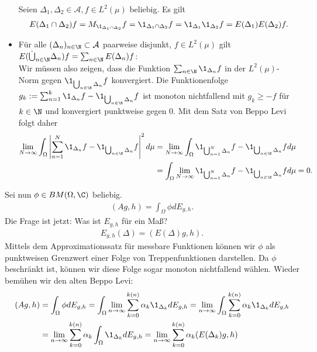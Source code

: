 \begin{solution}
\begin{itemize}
  Seien $\Delta_1,\Delta_2 \in \mathcal{A}, f \in L^2(\mu)$ beliebig. Es gilt
  \begin{align*}
    E(\Delta_1 \cap \Delta_2)f = M_{\1_{\Delta_1 \cap \Delta_2}}f
    = \1_{\Delta_1 \cap \Delta_2}f = \1_{\Delta_1}\1_{\Delta_2}f
    = E(\Delta_1)E(\Delta_2)f.
  \end{align*}
  \item Für alle $(\Delta_n)_{n \in \N} \subset \mathcal{A}$ paarweise disjunkt, $f \in L^2(\mu)$ gilt $E(\dot\bigcup_{n \in \N}\Delta_n)f = \sum_{n \in \N}E(\Delta_n)f$: \\
  Wir müssen also zeigen, dass die Funktion $\sum_{n \in \N}\1_{\Delta_n}f$
  in der $L^2(\mu)$-Norm gegen $\1_{\bigcup_{n \in \N}\Delta_n}f$ konvergiert.
  Die Funktionenfolge $g_k := \sum_{n = 1}^k\1_{\Delta_n}f - \1_{\bigcup_{n \in \N}\Delta_n}f$ ist monoton nichtfallend mit $g_k \geq -f$ für $k \in \N$
  und konvergiert punktweise gegen $0$.
  Mit dem Satz von Beppo Levi folgt daher
  \begin{align*}
  \lim_{N \to \infty}\int_\Omega \left|\sum_{n = 1}^N\1_{\Delta_n}f - \1_{\bigcup_{n \in \N}\Delta_n}f\right|^2 d\mu
  &= \lim_{N \to \infty}\int_\Omega \1_{\bigcup_{n = 1}^N\Delta_n}f -
  \1_{\bigcup_{n \in \N}\Delta_n}f
   d\mu \\
  &= \int_\Omega \lim_{N \to \infty} \1_{\bigcup_{n = 1}^N\Delta_n}f -
  \1_{\bigcup_{n \in \N}\Delta_n}f d\mu = 0.
  \end{align*}
\end{itemize}
Sei nun $\phi \in BM(\Omega,\C)$ beliebig.
\begin{align*}
  (Ag,h) = \int_{\Omega}\phi dE_{g,h}.
\end{align*}
Die Frage ist jetzt: Was ist $E_{g,h}$ für ein Maß?
\begin{align*}
  E_{g,h}(\Delta) = (E(\Delta)g,h).
\end{align*}
Mittels dem Approximationssatz für messbare Funktionen können wir $\phi$
als punktweisen Grenzwert einer Folge von Treppenfunktionen darstellen.
Da $\phi$ beschränkt ist, können wir diese Folge sogar monoton nichtfallend wählen.
Wieder bemühen wir den alten Beppo Levi:
\begin{align*}
  (Ag,h) &= \int_{\Omega}\phi dE_{g,h} = \int_{\Omega}\lim_{n \to \infty}
  \sum_{k=0}^{k(n)}\alpha_k\1_{\Delta_k} dE_{g,h}
  = \lim_{n \to \infty}\int_{\Omega}\sum_{k=0}^{k(n)}\alpha_k\1_{\Delta_k} dE_{g,h} \\
  &= \lim_{n \to \infty}\sum_{k=0}^{k(n)}\alpha_k\int_{\Omega}\1_{\Delta_k} dE_{g,h}
  = \lim_{n \to \infty}\sum_{k=0}^{k(n)}\alpha_k(E(\Delta_k)g,h)

\end{align*}
\end{solution}

